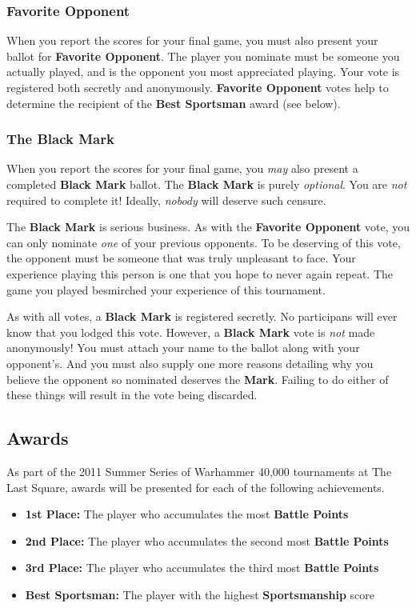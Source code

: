 \documentclass[12pt,titlepage]{article}
\begin{document}
\subsubsection*{Favorite Opponent}

When you report the scores for your final game, you must also present your ballot for \textbf{Favorite Opponent}. The player you nominate must be someone you actually played, and is the opponent you most appreciated playing. Your vote is registered both secretly and anonymously. \textbf{Favorite Opponent} votes help to determine the recipient of the \textbf{Best Sportsman} award (see below).

\subsubsection*{The Black Mark}

When you report the scores for your final game, you \textit{may} also present a completed \textbf{Black Mark} ballot. The \textbf{Black Mark} is purely \textit{optional}. You are \textit{not} required to complete it! Ideally, \textit{nobody} will deserve such censure.

The \textbf{Black Mark} is serious business. As with the \textbf{Favorite Opponent} vote, you can only nominate \textit{one} of your previous opponents. To be deserving of this vote, the opponent must be someone that was truly unpleasant to face. Your experience playing this person is one that you hope to never again repeat. The game you played besmirched your experience of this tournament.

As with all votes, a \textbf{Black Mark} is registered secretly. No participans will ever know that you lodged this vote. However, a \textbf{Black Mark} vote is \textit{not} made anonymously! You must attach your name to the ballot along with your opponent's. And you must also supply one more reasons detailing why you believe the opponent so nominated deserves the \textbf{Mark}. Failing to do either of these things will result in the vote being discarded.

\subsection*{Awards}

As part of the 2011 Summer Series of Warhammer 40,000 tournaments at The Last Square, awards will be presented for each of the following achievements.

\begin{itemize}
\item \textbf{1st Place:} The player who accumulates the most \textbf{Battle Points}
\item \textbf{2nd Place:} The player who accumulates the second most \textbf{Battle Points}
\item \textbf{3rd Place:} The player who accumulates the third most \textbf{Battle Points}
\item \textbf{Best Sportsman:} The player with the highest \textbf{Sportsmanship} score
\end{itemize}
\end{document}
